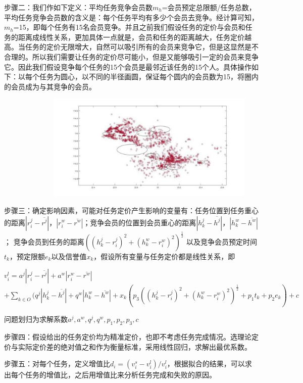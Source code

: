 \documentclass{ctexart}
\begin{document}
步骤二：我们作如下定义：平均任务竞争会员数$m_{h}$=会员预定总限额/任务总数，平均任务竞争会员数的含义是：每个任务平均有多少个会员去竞争。经计算可知，$m_{h}$=15，即每个任务有15名会员竞争。并且之前我们假设任务的定价与会员和任务的距离成线性关系，更加具体一点就是，会员和任务的距离越大，任务定价越高。当任务的定价无限增大，自然可以吸引所有的会员来竞争它，但是这显然是不合理的。所以我们需要让任务的定价尽可能小，但是又能够吸引一定的会员来竞争它。因此我们假设竞争每个任务的15个会员是最邻近该任务的15个人。具体操作如下：以每个任务为圆心，以不同的半径画圆，保证每个圆内的会员数为15，将圈内的会员成为与其竞争的会员。

 \  \ \ \ \ \ \ \ \ \ \ \ \ \ \includegraphics[width=10cm]{3.jpg}



步骤三：确定影响因素，可能对任务定价产生影响的变量有：任务位置到任务重心的距离$| r^{j}_{i} -\overline{r^{j}}|$，$|r^{w}_{i}-\overline{r^{w}}|$；竞争会员的位置到会员重心的距离$| h^{j}_{k} -\overline{h^{j}}|$，$|h^{w}_{k}-\overline{h^{w}}|$；
竞争会员到任务的距离$((h^{j}_{k}-r^{j}_{i})^{2}+(h^{w}_{k}-r^{w}_{i})^{2})^{\frac{1}{2}}$\; 以及竞争会员预定时间$t_{k}$，预定限额$e_{k}$以及信誉值$x_{k}$，假设所有变量与任务定价都是线性关系，即

$v^{l}_{i}=a^{j}|r^{j}_{i}-\overline{r^{j}}|+a^{w}|r^{w}_{i}-\overline{r^{w}}|$
$+\sum\limits_{k\in O}(q^{j}|h^{j}_{k}-\overline{h^{j}}|+q^{w}|h^{w}_{k}-\overline{h^{w}}|+x_{k}(p_{3}((h^{j}_{k}-r^{j}_{i})^{2}+(h^{w}_{k}-r^{w}_{i})^{2})^{\frac{1}{2}}+p_{1}t_{k}+p_{2}e_{k})+c$

问题划归为求解系数$a^{j},a^{w},q^{j},q^{w},p_{1},p_{2},p_{3} ,c$

步骤四：假设给出的任务定价均为精准定价，也即不考虑任务完成情况。选理论定价与实际定价差的绝对值之和作为衡量标准，采用线性回归，求解出最优系数。

    步骤五：对每个任务，定义增值比$d_{i}=(v^{s}_{i}-v^{l}_{i})/v^{l}_{i}$，根据拟合的结果，可以求出每个任务的增值比，之后用增值比来分析任务完成和失败的原因。
\end{document}

